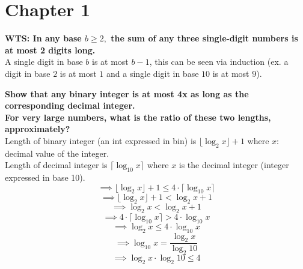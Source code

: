 \section{Chapter 1}
\begin{problem}{1.1}
    \textbf{WTS: In any base $b\geq2,$ the sum of any three single-digit numbers is at most 2 digits long.}
    \\
    A single digit in base $b$ is at most $b-1$, this can be seen via induction (ex. a digit in base $2$ is at most $1$ and a single digit in base $10$ is at most $9$).
    
\end{problem}


\begin{problem}{1.2}
    \textbf{Show that any binary integer is at most 4x as long as the corresponding decimal integer.
    \\
    For very large numbers, what is the ratio of these two lengths, approximately?}
    \\
    Length of binary integer (an int expressed in bin) is $\lfloor\log_2 x\rfloor + 1$ where $x:$ decimal value of the integer.
    \\
    Length of decimal integer is $\lceil\log_{10} x\rceil$ where $x$ is the decimal integer (integer expressed in base 10).
    \[
        \implies
        \lfloor\log_2 x\rfloor + 1 \leq 4\cdot\lceil\log_{10} x\rceil
    \]
    \[
        \implies
        \lfloor\log_2 x\rfloor+1<\log_2 x +1
    \]
    \[
        \implies
        \log_2 x<\log_2 x +1
    \]
    \[
        \implies
        4 \cdot\lceil\log_{10} x\rceil >4\cdot\log_{10} x
    \]
    \[
        \implies
        \log_2 x\leq 4\cdot\log_{10} x
    \]
    \[
        \implies
        \log_{10} x = \frac{\log_2 x}{\log_2 10}
    \]
    \[
        \implies
        \boxed{
          \log_2 x \cdot \log_2 10 \leq 4
        }
    \]
\end{problem}

